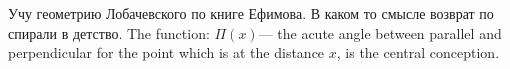 
    Учу геометрию Лобачевского по книге Ефимова.
     В каком то смысле возврат по спирали в детство.
        The function:
      $\Pi (x)$--- the acute angle between parallel and
perpendicular  for the point which is at the distance $x$,
is the central conception.



\bye
